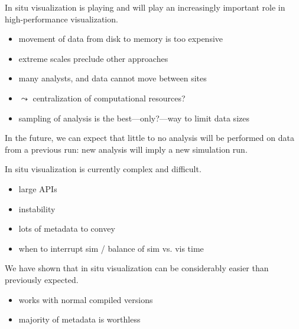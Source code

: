 

In situ visualization is playing and will play an increasingly important role
in high-performance visualization.
\begin{itemize}
	\item movement of data from disk to memory is too expensive
	\item extreme scales preclude other approaches
	\item many analysts, and data cannot move between sites
	\item $\leadsto$ centralization of computational resources?
	\item sampling of analysis is the best---only?---way to limit data sizes
\end{itemize}
In the future, we can expect that little to no analysis will be
performed on data from a previous run: new analysis will imply a new
simulation run.

In situ visualization is currently complex and difficult.
\begin{itemize}
	\item large APIs
	\item instability
	\item lots of metadata to convey
	\item when to interrupt sim / balance of sim vs. vis time
\end{itemize}

We have shown that in situ visualization can be considerably easier
than previously expected.
\begin{itemize}
	\item works with normal compiled versions
	\item majority of metadata is worthless
\end{itemize}
